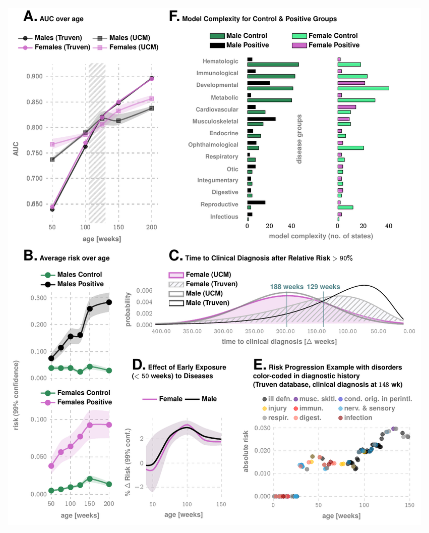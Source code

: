 \documentclass[3p,super,numbers,sort&compress,preprint,10pt]{elsarticle}
\newif\iftikzX
\begin{document}
\begin{figure}[!ht]
  \tikzexternalenable
  \vspace{-15pt}
  
  \centering 
  \def\DATA{../../data_revision}
  \iftikzX
  
  \else
  \includegraphics[width=0.975\textwidth]{Figures/External/perfB.pdf}
  \fi
  \vspace{-10pt}


\end{figure}
\end{document}
